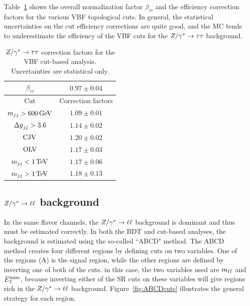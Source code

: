 Table~\ref{tab:vbf_cb_zttnf} shows the overall normalization factor $\beta_{\tau\tau}$ and the efficiency correction factors for the various VBF topological cuts. In general, the statistical uncertainties on the cut efficiency corrections are quite good, and the MC tends to underestimate the efficiency of the VBF cuts for the $Z/\gamma^{\ast}\to\tau\tau$ background. 

\begin{table}[h!]
\centering
\captionsetup{justification=centering}
\begin{tabular}{|c|c|}
\hline
$\beta_{\tau\tau}$ & $0.97 \pm 0.04$ \\ \hline\hline
 Cut & Correction factors \\ \hline
$\mjj > 600 \GeV$ & $1.09 \pm 0.01$ \\ \hline
$\dyjj > 3.6 $ & $1.14 \pm 0.02$ \\ \hline
$\rm CJV$ & $1.20 \pm 0.02$ \\ \hline
$\rm OLV$ & $1.17 \pm 0.03$ \\ \hline
$\mjj < 1 \TeV$ & $1.17 \pm 0.06$ \\ \hline
$\mjj > 1 \TeV$ & $1.18 \pm 0.13$ \\ \hline 
\end{tabular}
\caption{$Z/\gamma^{\ast} \to\tau\tau$ correction factors for the VBF cut-based analysis. Uncertainties are statistical only.}
\label{tab:vbf_cb_zttnf}
\end{table}

\subsection{$Z/\gamma^{\ast} \to \ell\ell$ background}

In the same flavor channels, the $Z/\gamma^{\ast} \to \ell\ell$ background is dominant and thus must be estimated correctly. In both the BDT and cut-based analyses, the background is estimated using the so-called ``ABCD" method. The ABCD method creates four different regions by defining cuts on two variables. One of the regions (A) is the signal region, while the other regions are defined by inverting one of both of the cuts. in this case, the two variables used are $m_{\ell\ell}$ and $E_{\textrm{\footnotesize\sc t}}^{\rm miss}$, because inverting either of the SR cuts on these variables will give regions rich in the $Z/\gamma^{\ast}\to\ell\ell$ background. Figure~\ref{fig:ABCDcuts} illustrates the general strategy for each region. 


